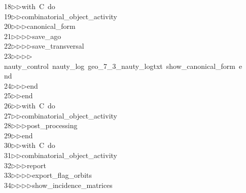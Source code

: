 \begin{tabbing}
18\>$\triangleright$\>$\triangleright$\>with\ C\ do\ \\[0pt]
19\>$\triangleright$\>$\triangleright$\>combinatorial\_object\_activity\ \\[0pt]
20\>$\triangleright$\>$\triangleright$\>$\triangleright$\>canonical\_form\ \\[0pt]
21\>$\triangleright$\>$\triangleright$\>$\triangleright$\>$\triangleright$\>save\_ago\ \\[0pt]
22\>$\triangleright$\>$\triangleright$\>$\triangleright$\>$\triangleright$\>save\_transversal\ \\[0pt]
23\>$\triangleright$\>$\triangleright$\>$\triangleright$\>$\triangleright$\>nauty\_control\ nauty\_log\ geo\_7\_3\_nauty\_logtxt\ show\_canonical\_form\ e\\[0pt]
\>nd\ \\[0pt]
24\>$\triangleright$\>$\triangleright$\>$\triangleright$\>end\ \\[0pt]
25\>$\triangleright$\>$\triangleright$\>end\ \\[0pt]
26\>$\triangleright$\>$\triangleright$\>with\ C\ do\ \\[0pt]
27\>$\triangleright$\>$\triangleright$\>combinatorial\_object\_activity\ \\[0pt]
28\>$\triangleright$\>$\triangleright$\>$\triangleright$\>post\_processing\ \\[0pt]
29\>$\triangleright$\>$\triangleright$\>end\ \\[0pt]
30\>$\triangleright$\>$\triangleright$\>with\ C\ do\ \\[0pt]
31\>$\triangleright$\>$\triangleright$\>combinatorial\_object\_activity\ \\[0pt]
32\>$\triangleright$\>$\triangleright$\>$\triangleright$\>report\ \\[0pt]
33\>$\triangleright$\>$\triangleright$\>$\triangleright$\>$\triangleright$\>export\_flag\_orbits\ \\[0pt]
34\>$\triangleright$\>$\triangleright$\>$\triangleright$\>$\triangleright$\>show\_incidence\_matrices\ \\[0pt]

\end{tabbing}
